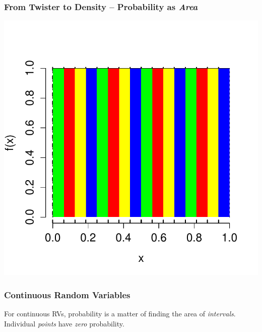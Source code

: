 \documentclass[handout]{beamer}
\begin{document}

\begin{frame}
\frametitle{From Twister to Density -- Probability as \emph{Area}}

\centering
	\includegraphics[scale = 0.6]{./images/twister_density}

\end{frame}



\begin{frame}
\frametitle{Continuous Random Variables}

For continuous RVs, probability is a matter of finding the area of \emph{intervals}. Individual \emph{points} have \emph{zero} probability.

\end{frame}




\end{document}
